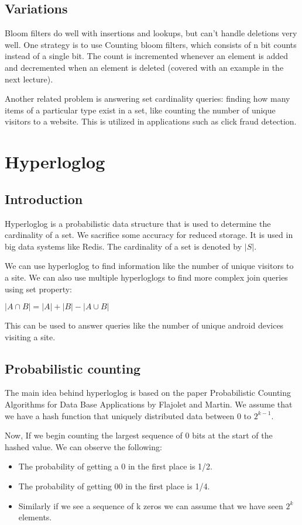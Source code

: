 \documentclass[twoside]{article}
\begin{document}
\subsection{Variations}
Bloom filters do well with insertions and lookups, but can't handle deletions very well. One strategy is to use Counting bloom filters, which consists of n bit counts instead of a single bit. The count is incremented whenever an element is added and decremented when an element is deleted (covered with an example in the next lecture). 

\par
Another related problem is answering set cardinality queries: finding how many items of a particular type exist in a set, like counting the number of unique visitors to a website. This is utilized in applications such as click fraud detection.


\section{Hyperloglog}
\subsection{Introduction}
\par
Hyperloglog is a probabilistic data structure that is used to determine the cardinality of a set. We sacrifice some accuracy for reduced storage. It is used in big data systems like Redis. The cardinality of a set is denoted by $ |S| $.
\par
We can use hyperloglog to find information like the number of unique visitors to a site. We can also use multiple hyperloglogs to find more complex join queries using set property:

$|A \cap B|=|A|+|B|-|A \cup B|  $

\par

This can be used to answer queries like the number of unique android devices visiting a site. 

\subsection{Probabilistic counting}
The main idea behind hyperloglog is based on the paper Probabilistic Counting Algorithms for Data Base Applications by Flajolet and Martin. We assume that we have a hash function that uniquely distributed data between 0 to $2^{k-1}$. 
\par
Now, If we begin counting the largest sequence of  0 bits at the start of the hashed value. We can observe the following:
\begin{itemize}
\item The probability of getting a 0 in the first place is 1/2.
\item The probability of getting 00 in the first place is 1/4. 
\item Similarly if we see a sequence of k zeros we can assume that we have seen $2^k$ elements. 
\end{itemize}
\end{document}
